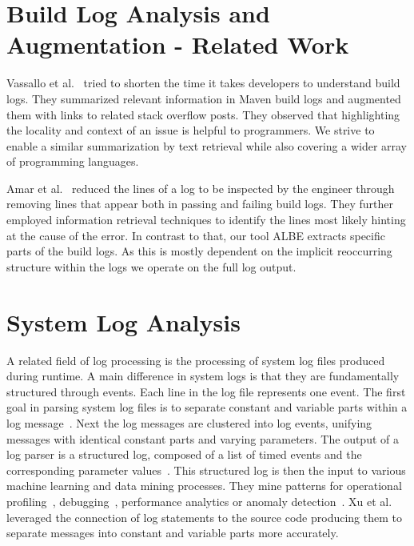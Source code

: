 \documentclass[\myrootdir/main.tex]{subfiles}
\begin{document}
\section{Build Log Analysis and Augmentation - Related Work}
\label{sec:rw-bl-analysis}
Vassallo et al.~\cite{vassallo2018un-break} tried to shorten the time it takes developers to understand build logs. They summarized relevant information in Maven build logs and augmented them with links to related stack overflow posts. They observed that highlighting the locality and context of an issue is helpful to programmers. We strive to enable a similar summarization by text retrieval while also covering a wider array of programming languages.

Amar et al.~\cite{amar2019mining} reduced the lines  of a log to be inspected by the engineer through removing lines that appear both in passing and failing build logs. They further employed information retrieval techniques to identify the lines most likely hinting at the cause of the error. In contrast to that, our tool ALBE extracts specific parts of the build logs. As this is mostly dependent on the implicit reoccurring structure within the logs we operate on the full log output.

\section{System Log Analysis} 

A related field of log processing is the processing of system log files produced during runtime.
A main difference in system logs is that they are fundamentally structured through events.
Each line in the log file represents one event.
The first goal in parsing system log files is to separate constant and variable parts within a log message~\cite{nagappan2010abstracting,he2017towards}.
Next the log messages are clustered into log events, unifying messages with identical constant parts and varying parameters.
The output of a log parser is a structured log, composed of a list of timed events and the corresponding parameter values~\cite{he2016evaluation}.
This structured log is then the input to various machine learning and data mining processes.
They mine patterns for operational profiling~\cite{nagappan2009efficiently}, debugging~\cite{oliner2012advances}, performance analytics or anomaly detection~\cite{nagappan2010abstracting}.
Xu et al.~\cite{xu2009detecting} leveraged the connection of log statements to the source code producing them to separate messages into constant and variable parts more accurately.
\end{document}
